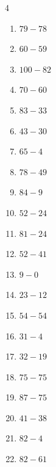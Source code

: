 \begin{multicols}{4}
\begin{enumerate}
  \item $79-78$
        \phantom{$=1$}

  \item $60-59$
        \phantom{$=1$}

  \item $100-82$
        \phantom{$=18$}

  \item $70-60$
        \phantom{$=10$}

  \item $83-33$
        \phantom{$=50$}

  \item $43-30$
        \phantom{$=13$}

  \item $65-4$
        \phantom{$=61$}

  \item $78-49$
        \phantom{$=29$}

  \item $84-9$
        \phantom{$=75$}

  \item $52-24$
        \phantom{$=28$}

  \item $81-24$
        \phantom{$=57$}

  \item $52-41$
        \phantom{$=11$}

  \item $9-0$
        \phantom{$=9$}

  \item $23-12$
        \phantom{$=11$}

  \item $54-54$
        \phantom{$=0$}

  \item $31-4$
        \phantom{$=27$}

  \item $32-19$
        \phantom{$=13$}

  \item $75-75$
        \phantom{$=0$}

  \item $87-75$
        \phantom{$=12$}

\columnbreak %

  \item $41-38$
        \phantom{$=3$}

  \item $82-4$
        \phantom{$=78$}

  \item $82-61$
        \phantom{$=21$}


\end{enumerate}
\end{multicols}
